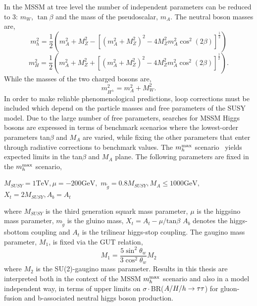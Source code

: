 In the MSSM at tree level the number of independent parameters can be reduced to 3: $m_{W}$,
$\tan{\beta}$ and the mass of the pseudoscalar, $m_{A}$. The neutral boson masses are,
\begin{equation}
m_{h}^{2}=\frac{1}{2}\left(m_{A}^{2}+M_{Z}^{2}-\left[(m_{A}^{2}+
M_{Z}^{2})^{2}-4M_{Z}^{2}m_{A}^{2}\cos^{2}{(2\beta)}\right]^{\frac{1}{2}}\right)
\end{equation}
\nobreak
\begin{equation}
m_{H}^{2}=\frac{1}{2}\left(m_{A}^{2}+M_{Z}^{2}+\left[(m_{A}^{2}+
M_{Z}^{2})^{2}-4M_{Z}^{2}m_{A}^{2}\cos^{2}{(2\beta)}\right]^{\frac{1}{2}}\right).
\end{equation}
While the masses of the two charged bosons are,
\begin{equation}
m_{H^{\pm}}^{2}=m_{A}^{2}+M_{W}^{2}.
\end{equation}
In order to make reliable phenomenological predictions, loop corrections must be included
which depend on the particle masses and free parameters of the SUSY model.
Due to the large number of free parameters,
searches for MSSM Higgs bosons are expressed in terms of benchmark scenarios where 
the lowest-order parameters tan$\beta$ and $M_A$ are varied, while fixing the other parameters that 
enter through radiative corrections to benchmark values. 
The $m_{h}^{\rm max}$ scenario~\cite{MHMAX-Carena,MHMAX-Carena-2002}
yields expected limits in the tan$\beta$ and $M_A$ plane. %
The following parameters are fixed in the $m_{h}^{\rm max}$ scenario,
\begin{center}
$
M_{SUSY} = 1 \mathrm{TeV}, 
\mu=-200 \mathrm{GeV}, 
$
\linebreak[4]
$
m_{\tilde{g}}=0.8 M_{SUSY}, 
M_{A} \leq 1000 \mathrm{GeV}, 
$
\linebreak[4]
$
X_{t}=2M_{SUSY}, 
A_{b} = A_{t}
$
\end{center}
where 
$M_{SUSY}$ is the third generation squark mass parameter,
$\mu$ is the higgsino mass parameter,
$m_{\tilde{g}}$ is the gluino mass,
$X_{t}= A_{t}-\mu/\mathrm{tan}\beta$
$A_{b}$ denotes the higgs-sbottom coupling and
$A_{t}$ is the trilinear higgs-stop coupling.
The gaugino mass parameter, $M_{1}$, is fixed via the GUT relation,
\begin{equation} 
M_{1}=\frac{5\sin^{2}{\theta_{w}}}{3\cos^{2}{\theta_{w}}}M_{2}
\end{equation}
where $M_{2}$ is the SU(2)-gaugino mass parameter.
Results in this thesis are interpreted both in the context of the MSSM 
$m_{h}^{\rm max}$ scenario and also in a model independent way, 
in terms of upper limits on $\sigma\cdot$BR($A\slash H\slash h\rightarrow\mathrm{\tau}\mathrm{\tau}$) for 
gluon-fusion and b-associated neutral higgs boson production.

